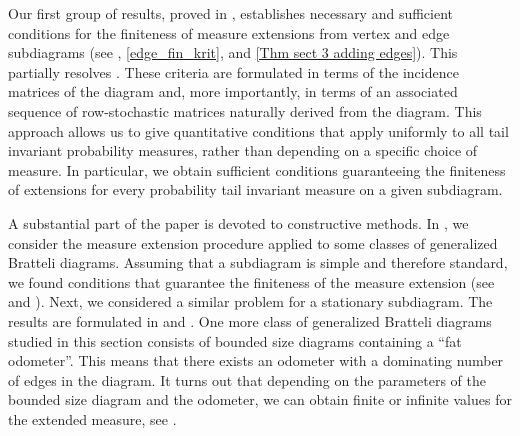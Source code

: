\documentclass[11pt,reqno]{amsart}
\theoremstyle{definition}
\theoremstyle{remark}
\theoremstyle{plain}
\numberwithin{equation}{section}
\begin{document}
Our first group of results, proved in , establishes necessary and sufficient conditions for the finiteness of measure extensions from vertex and edge subdiagrams (see , \ref{edge_fin_krit}, and \ref{Thm sect 3 adding edges}). This partially resolves \cite[Problem 3, Section 9]{BezuglyiJorgensenKarpelSanadhya2025}. These criteria are formulated in terms of the incidence matrices of the diagram and, more importantly, in terms of an associated sequence of row-stochastic matrices naturally derived from the diagram. This approach allows us to give quantitative conditions that apply uniformly to all tail invariant probability measures, rather than depending on a specific choice of measure. In particular, we obtain sufficient conditions guaranteeing the finiteness of extensions for every probability tail invariant measure on a given subdiagram. 

A substantial part of the paper is devoted to constructive methods. In , we consider the measure extension procedure applied to some classes of generalized Bratteli diagrams. Assuming that a subdiagram is simple and therefore standard, we found conditions that guarantee the finiteness of the measure extension (see  and ). Next, we considered a similar problem for a stationary subdiagram. The results are formulated in  and . One more class of generalized Bratteli diagrams studied in this section consists of bounded size diagrams containing a ``fat odometer''. This means that there exists an odometer with a dominating number of edges in the diagram. It turns out that depending on the parameters of the bounded size diagram and the odometer, we can obtain finite or infinite values for the extended measure, see . 
\end{document}
